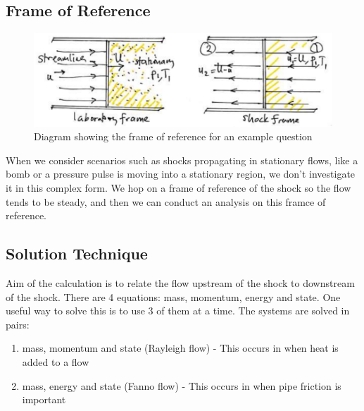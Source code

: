 \subsection{Frame of Reference}
\begin{figure}[H]
    \centering
    \includegraphics[width = 0.9 \textwidth]{./img/diagram5.PNG}
    \caption{Diagram showing the frame of reference for an example question}
\end{figure}
When we consider scenarios such as shocks propagating in stationary flows, like a bomb or a pressure pulse is moving into a stationary region, we don't investigate it in this complex form.
We hop on a frame of reference of the shock so the flow tends to be steady, and then we can conduct an analysis on this framce of reference.
\subsection{Solution Technique}
Aim of the calculation is to relate the flow upstream of the shock to downstream of the shock.
There are 4 equations: mass, momentum, energy and state.
One useful way to solve this is to use 3 of them at a time.
The systems are solved in pairs:
\begin{enumerate}[label=(\alph*), noitemsep]
    \item mass, momentum and state (Rayleigh flow) - This occurs in when heat is added to a flow
    \item mass, energy and state (Fanno flow) - This occurs in when pipe friction is important
\end{enumerate}
